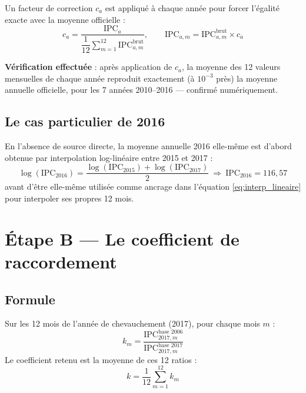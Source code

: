 \documentclass[11pt,a4paper]{article}
\begin{document}
Un facteur de correction $c_a$ est appliqué à chaque année pour forcer l'égalité exacte avec la moyenne officielle :
\begin{equation}
c_a = \frac{\text{IPC}_a}{\dfrac{1}{12}\sum_{m=1}^{12} \text{IPC}_{a,m}^{\text{brut}}}, \qquad
\text{IPC}_{a,m} = \text{IPC}_{a,m}^{\text{brut}} \times c_a
\label{eq:correction_denton}
\end{equation}

\begin{fichebox}
\textbf{Vérification effectuée} : après application de $c_a$, la moyenne des 12 valeurs mensuelles de chaque année reproduit exactement (à $10^{-3}$ près) la moyenne annuelle officielle, pour les 7 années 2010--2016 --- confirmé numériquement.
\end{fichebox}

\subsection{Le cas particulier de 2016}
\label{eq:interp_2016}

En l'absence de source directe, la moyenne annuelle 2016 elle-même est d'abord obtenue par interpolation log-linéaire entre 2015 et 2017 :
\begin{equation}
\log(\text{IPC}_{2016}) = \frac{\log(\text{IPC}_{2015}) + \log(\text{IPC}_{2017})}{2} \ \Rightarrow\ \text{IPC}_{2016} = 116{,}57
\end{equation}
avant d'être elle-même utilisée comme ancrage dans l'équation \ref{eq:interp_lineaire} pour interpoler ses propres 12 mois.

\section{Étape B --- Le coefficient de raccordement}

\subsection{Formule}

Sur les 12 mois de l'année de chevauchement (2017), pour chaque mois $m$ :
\begin{equation}
k_m = \frac{\text{IPC}_{2017,m}^{\text{base 2006}}}{\text{IPC}_{2017,m}^{\text{base 2017}}}
\end{equation}
Le coefficient retenu est la moyenne de ces 12 ratios :
\begin{equation}
k = \frac{1}{12}\sum_{m=1}^{12} k_m
\label{eq:coef_raccord}
\end{equation}
\end{document}
